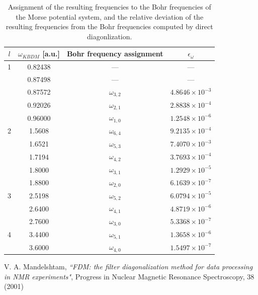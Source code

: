 \documentclass[12pt, a4paper]{article}
\begin{document}
\begin{table}
\begin{center}
\renewcommand{\arraystretch}{1.2}
\begin{tabular}{|c||c|c|c|}	\hline
	$l$ & $\omega_{KBDM}$ [a.u.] & \textbf{Bohr frequency assignment} & $\epsilon_{\omega}$\\ \hline \hline
	1 & 0.82438 & --- & --- \\ \cline{2-4}
	  & 0.87498 & --- & --- \\ \cline{2-4}
	  & 0.87572 & $\omega_{3,2}$ & $4.8646\times 10^{-3}$ \\ \cline{2-4}
	  & 0.92026 & $\omega_{2,1}$ & $2.8838\times 10^{-4}$ \\ \cline{2-4}
	  & 0.96000 & $\omega_{1,0}$ & $1.2548\times 10^{-6}$ \\ \hline \hline
	2 & 1.5608 & $\omega_{6,4}$ & $9.2135\times 10^{-4}$ \\ \cline{2-4}
	  & 1.6521 & $\omega_{5,3}$ & $7.4070\times 10^{-3}$ \\ \cline{2-4}
	  & 1.7194 & $\omega_{4,2}$ & $3.7693\times 10^{-4}$ \\ \cline{2-4}
	  & 1.8000 & $\omega_{3,1}$ & $1.2929\times 10^{-5}$ \\ \cline{2-4}
	  & 1.8800 & $\omega_{2,0}$ & $6.1639\times 10^{-7}$ \\ \hline \hline
	3 & 2.5198 & $\omega_{5,2}$ & $6.0794\times 10^{-5}$ \\ \cline{2-4}
  	  & 2.6400 & $\omega_{4,1}$ & $4.8719\times 10^{-6}$ \\ \cline{2-4}
	  & 2.7600 & $\omega_{3,0}$ & $5.3368\times 10^{-7}$ \\ \hline \hline
  	4 & 3.4400 & $\omega_{5,1}$ & $1.3658\times 10^{-6}$ \\ \cline{2-4}
  	  & 3.6000 & $\omega_{4,0}$ & $1.5497\times 10^{-7}$ \\ \hline 
\end{tabular}
\end{center}
\caption{Assignment of the resulting frequencies to the Bohr frequencies of the Morse potential system, and the relative deviation of the resulting frequencies from the Bohr frequencies computed by direct diagonlization.}\label{tab}
\end{table}


\begin{thebibliography}{999}
	V. A. Mandelshtam, \emph{``FDM: the filter diagonalization method for data processing in NMR experiments"}, Progress in Nuclear Magnetic Resonance Spectroscopy, 38 (2001)
\end{thebibliography}
\end{document}
